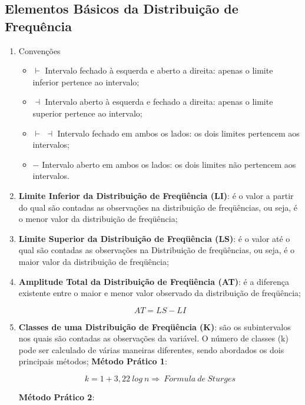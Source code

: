 \newpage


\subsection{Elementos Básicos da Distribuição de Frequência}


\begin{enumerate}
  \item Convenções
  \begin{itemize}
    \item $\vdash$ Intervalo fechado à esquerda e aberto a direita: apenas o limite inferior pertence ao intervalo;
    \item $\dashv$ Intervalo aberto à esquerda e fechado a direita: apenas o limite superior pertence ao intervalo;
    \item $\vdash$ $\dashv$ Intervalo fechado em ambos os lados: os dois limites pertencem aos intervalos;
    \item $-$ Intervalo aberto em ambos os lados: os dois limites não pertencem aos intervalos.
  \end{itemize}
  \item \textbf{Limite Inferior da Distribuição de Freqüência (LI)}: é o valor a partir do qual são contadas as observações na distribuição de freqüências, ou seja, é o menor valor da distribuição de freqüência;
  \item \textbf{Limite Superior da Distribuição de Freqüência (LS)}: é o valor até o qual são contadas as observações na Distribuição de freqüências, ou seja, é o maior valor da distribuição de freqüência;
  \item \textbf{Amplitude Total da Distribuição de Freqüência (AT)}: é a diferença existente entre o maior e menor valor observado da distribuição de freqüência;

     $$ AT=LS-LI $$

  \item \textbf{Classes de uma Distribuição de Freqüência (K)}: são os subintervalos nos quais são contadas as observações da variável. O número de classes (k) pode ser calculado de várias maneiras diferentes, sendo abordados os dois principais métodos;\vskip0.3cm
\textbf{Método Prático 1}:

$$ k= 1+3,22 \ log \ n \Rightarrow \ Formula \ de \ Sturges $$

\textbf{Método Prático 2}: \vskip0.3cm


\end{enumerate}
